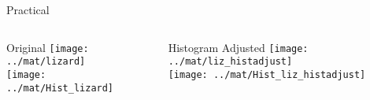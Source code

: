 %
%
\begin{slide}{Practical}
\vspace{-3ex}
\begin{columns}
\begin{column}{0.45\textwidth}
\begin{center}
Original
\texttt{[image: ../mat/lizard]}\\
\texttt{[image: ../mat/Hist\_lizard]}
\end{center}
\end{column}
\begin{column}{0.45\textwidth}
\begin{center}
Histogram Adjusted
\texttt{[image: ../mat/liz\_histadjust]}\\
\texttt{[image: ../mat/Hist\_liz\_histadjust]}
\end{center}
\end{column}
\end{columns}
\end{slide}


